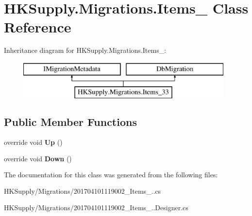 \hypertarget{class_h_k_supply_1_1_migrations_1_1_items__33}{}\section{H\+K\+Supply.\+Migrations.\+Items\+\_ Class Reference}
\label{class_h_k_supply_1_1_migrations_1_1_items__33}
Inheritance diagram for H\+K\+Supply.\+Migrations.\+Items\+\_\+:\begin{figure}[H]
\begin{center}
\leavevmode
\includegraphics[height=2.000000cm]{class_h_k_supply_1_1_migrations_1_1_items__33}
\end{center}
\end{figure}
\subsection*{Public Member Functions}
\begin{DoxyCompactItemize}
\item 
\mbox{\label{class_h_k_supply_1_1_migrations_1_1_items__33_a8c89ed5a8b78b51c8f5fe381ec379f56}} 
override void {\bfseries Up} ()
\item 
\mbox{\label{class_h_k_supply_1_1_migrations_1_1_items__33_ae5f2bd9612c95be463245dc08b5bb7d7}} 
override void {\bfseries Down} ()
\end{DoxyCompactItemize}


The documentation for this class was generated from the following files\+:\begin{DoxyCompactItemize}
\item 
H\+K\+Supply/\+Migrations/201704101119002\+\_\+\+Items\+\_..\+cs\item 
H\+K\+Supply/\+Migrations/201704101119002\+\_\+\+Items\+\_..\+Designer.\+cs\end{DoxyCompactItemize}
